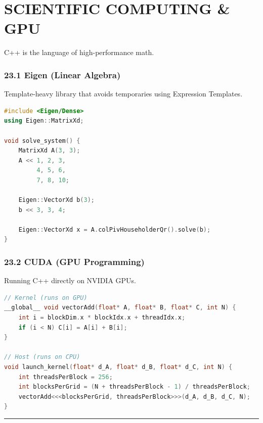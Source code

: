 \hypertarget{scientific-computing-gpu}{%
\chapter{SCIENTIFIC COMPUTING \& GPU}\label{scientific-computing-gpu}}

C++ is the language of high-performance math.

\hypertarget{eigen-linear-algebra}{%
\subsection{23.1 Eigen (Linear Algebra)}\label{eigen-linear-algebra}}

Template-heavy library that avoids temporaries using Expression
Templates.

\begin{lstlisting}[language={C++}]
#include <Eigen/Dense>
using Eigen::MatrixXd;

void solve_system() {
    MatrixXd A(3, 3);
    A << 1, 2, 3,
         4, 5, 6,
         7, 8, 10;
    
    Eigen::VectorXd b(3);
    b << 3, 3, 4;
    
    Eigen::VectorXd x = A.colPivHouseholderQr().solve(b);
}
\end{lstlisting}

\hypertarget{cuda-gpu-programming}{%
\subsection{23.2 CUDA (GPU Programming)}\label{cuda-gpu-programming}}

Running C++ directly on NVIDIA GPUs.

\begin{lstlisting}[language={C++}]
// Kernel (runs on GPU)
__global__ void vectorAdd(float* A, float* B, float* C, int N) {
    int i = blockDim.x * blockIdx.x + threadIdx.x;
    if (i < N) C[i] = A[i] + B[i];
}

// Host (runs on CPU)
void launch_kernel(float* d_A, float* d_B, float* d_C, int N) {
    int threadsPerBlock = 256;
    int blocksPerGrid = (N + threadsPerBlock - 1) / threadsPerBlock;
    vectorAdd<<<blocksPerGrid, threadsPerBlock>>>(d_A, d_B, d_C, N);
}
\end{lstlisting}

\begin{center}\rule{0.5\linewidth}{0.5pt}\end{center}
